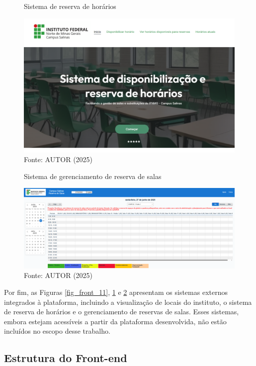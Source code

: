 \begin{figure}[H]
    \centering
    \caption{Sistema de reserva de horários}
    \includegraphics[width=1\textwidth]{Figuras/front-12.png}
    \caption*{Fonte: AUTOR (2025)}
    \label{fig_front_12}
\end{figure}

\begin{figure}[htb]
    \centering
    \caption{Sistema de gerenciamento de reserva de salas}
    \includegraphics[width=1\textwidth]{Figuras/front-13.png}
    \caption*{Fonte: AUTOR (2025)}
    \label{fig_front_13}
\end{figure}

Por fim, as Figuras \ref{fig_front_11}, \ref{fig_front_12} e \ref{fig_front_13} apresentam os sistemas externos integrados à plataforma, incluindo a visualização de locais do instituto, o sistema de reserva de horários e o gerenciamento de reservas de salas. Esses sistemas, embora estejam acessíveis a partir da plataforma desenvolvida, não estão incluídos no escopo desse trabalho.

\subsection{Estrutura do Front-end}

